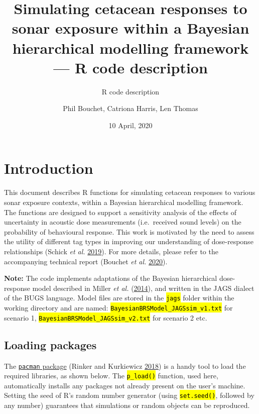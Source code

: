 \documentclass[
]{article}
\title{Simulating cetacean responses to sonar exposure within a Bayesian hierarchical modelling framework --- R code description}
\subtitle{R code description}
\author{Phil Bouchet, Catriona Harris, Len Thomas}
\date{10 April, 2020}
\begin{document}
\maketitle

{
\hypersetup{linkcolor=black}
\setcounter{tocdepth}{3}
\tableofcontents
}
\renewcommand{\figurename}{\textbf{Figure }}
\renewcommand{\caption}{\textbf{Figure }}
\newcommand{\code}[1]{\textcolor{codecolor}{\texttt{\hl{#1}}}}

\section{Introduction}

This document describes R functions for simulating cetacean responses to various sonar exposure contexts, within a Bayesian hierarchical modelling framework. The functions are designed to support a sensitivity analysis of the effects of uncertainty in acoustic dose measurements (i.e.~received sound levels) on the probability of behavioural response. This work is motivated by the need to assess the utility of different tag types in improving our understanding of dose-response relationships (Schick \emph{et al.} \protect\hyperlink{ref-Schick2019}{2019}). For more details, please refer to the accompanying technical report (Bouchet \emph{et al.} \protect\hyperlink{ref-Bouchet2020a}{2020}).

\textbf{Note:} The code implements adaptations of the Bayesian hierarchical dose-response model described in Miller \emph{et al.} (\protect\hyperlink{ref-Miller2014}{2014}), and written in the JAGS dialect of the BUGS language. Model files are stored in the \textcolor{codecolor}{\texttt{\hl{jags}}} folder within the working directory and are named: \textcolor{codecolor}{\texttt{\hl{BayesianBRSModel\_JAGSsim\_v1.txt}}} for scenario 1, \textcolor{codecolor}{\texttt{\hl{BayesianBRSModel\_JAGSsim\_v2.txt}}} for scenario 2 etc.

\subsection{Loading packages}

The \href{https://cran.r-project.org/web/packages/pacman/index.html}{\texttt{pacman} package} (Rinker and Kurkiewicz \protect\hyperlink{ref-Rinker2018}{2018}) is a handy tool to load the required libraries, as shown below. The \textcolor{codecolor}{\texttt{\hl{p\_load()}}} function, used here, automatically installs any packages not already present on the user's machine. Setting the seed of R's random number generator (using \textcolor{codecolor}{\texttt{\hl{set.seed()}}}, followed by any number) guarantees that simulations or random objects can be reproduced.
\end{document}
